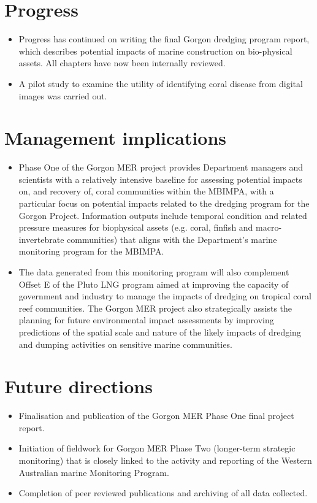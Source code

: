 \documentclass[version=last,
    paper=a4, %
    10pt, %
    usenames,
    dvipsnames,
    oneside, %
    headings=openany, %
    DIV=15 %
]{scrbook}
\begin{document}
\section*{Progress}
\begin{itemize}
\itemsep1pt\parskip0pt
\item
  Progress has continued on writing the final Gorgon dredging program
  report, which describes potential impacts of marine construction on
  bio-physical assets. All chapters have now been internally reviewed.
\item
  A pilot study to examine the utility of identifying coral disease from
  digital images was carried out.
\end{itemize}



\section*{Management implications}
\begin{itemize}
\itemsep1pt\parskip0pt
\item
  Phase One of the Gorgon MER project provides Department managers and
  scientists with a relatively intensive baseline for assessing
  potential impacts on, and recovery of, coral communities within the
  MBIMPA, with a particular focus on potential impacts related to the
  dredging program for the Gorgon Project. Information outputs include
  temporal condition and related pressure measures for biophysical
  assets (e.g. coral, finfish and macro-invertebrate communities) that
  aligns with the Department's marine monitoring program for the MBIMPA.
\item
  The data generated from this monitoring program will also complement
  Offset E of the Pluto LNG program aimed at improving the capacity of
  government and industry to manage the impacts of dredging on tropical
  coral reef communities. The Gorgon MER project also strategically
  assists the planning for future environmental impact assessments by
  improving predictions of the spatial scale and nature of the likely
  impacts of dredging and dumping activities on sensitive marine
  communities.
\end{itemize}



\section*{Future directions}
\begin{itemize}
\itemsep1pt\parskip0pt
\item
  Finalisation and publication of the Gorgon MER Phase One final project
  report.
\item
  Initiation of fieldwork for Gorgon MER Phase Two (longer-term
  strategic monitoring) that is closely linked to the activity and
  reporting of the Western Australian marine Monitoring Program.
\item
  Completion of peer reviewed publications and archiving of all data
  collected.
\end{itemize}



\end{document}
